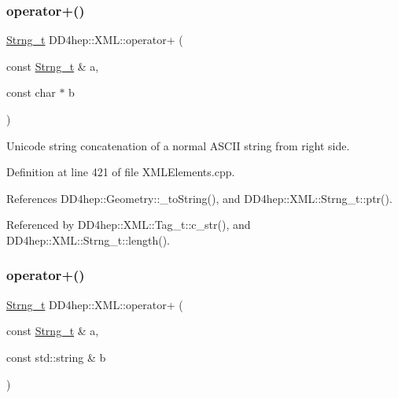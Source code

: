 \subsubsection{\texorpdfstring{operator+()}{operator+()}\hspace{0.1cm}{\footnotesize\ttfamily [1/14]}}
{\footnotesize\ttfamily \hyperlink{class_d_d4hep_1_1_x_m_l_1_1_strng__t}{Strng\+\_\+t} D\+D4hep\+::\+X\+M\+L\+::operator+ (\begin{DoxyParamCaption}\item[{const \hyperlink{class_d_d4hep_1_1_x_m_l_1_1_strng__t}{Strng\+\_\+t} \&}]{a,  }\item[{const char $\ast$}]{b }\end{DoxyParamCaption})}



Unicode string concatenation of a normal A\+S\+C\+II string from right side. 



Definition at line 421 of file X\+M\+L\+Elements.\+cpp.



References D\+D4hep\+::\+Geometry\+::\+\_\+to\+String(), and D\+D4hep\+::\+X\+M\+L\+::\+Strng\+\_\+t\+::ptr().



Referenced by D\+D4hep\+::\+X\+M\+L\+::\+Tag\+\_\+t\+::c\+\_\+str(), and D\+D4hep\+::\+X\+M\+L\+::\+Strng\+\_\+t\+::length().

\hypertarget{group___d_d4_h_e_p___x_m_l_gaf514b02eb314678df1b7149c4f0025b2}{}\label{group___d_d4_h_e_p___x_m_l_gaf514b02eb314678df1b7149c4f0025b2} 
\subsubsection{\texorpdfstring{operator+()}{operator+()}\hspace{0.1cm}{\footnotesize\ttfamily [2/14]}}
{\footnotesize\ttfamily \hyperlink{class_d_d4hep_1_1_x_m_l_1_1_strng__t}{Strng\+\_\+t} D\+D4hep\+::\+X\+M\+L\+::operator+ (\begin{DoxyParamCaption}\item[{const \hyperlink{class_d_d4hep_1_1_x_m_l_1_1_strng__t}{Strng\+\_\+t} \&}]{a,  }\item[{const std\+::string \&}]{b }\end{DoxyParamCaption})}



